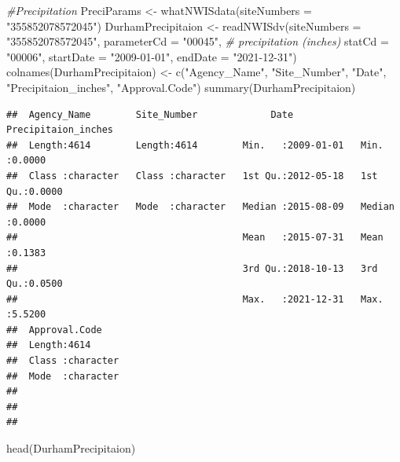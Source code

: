 \documentclass[
  12pt,
]{article}
\newenvironment{Shaded}{\begin{snugshade}}{\end{snugshade}}
\newcommand{\AttributeTok}[1]{\textcolor[rgb]{0.77,0.63,0.00}{#1}}
\newcommand{\CommentTok}[1]{\textcolor[rgb]{0.56,0.35,0.01}{\textit{#1}}}
\newcommand{\FunctionTok}[1]{\textcolor[rgb]{0.00,0.00,0.00}{#1}}
\newcommand{\NormalTok}[1]{#1}
\newcommand{\OtherTok}[1]{\textcolor[rgb]{0.56,0.35,0.01}{#1}}
\newcommand{\StringTok}[1]{\textcolor[rgb]{0.31,0.60,0.02}{#1}}
\begin{document}
\begin{Shaded}
\begin{Highlighting}[]
\CommentTok{\#Precipitation}
\NormalTok{PreciParams }\OtherTok{\textless{}{-}} \FunctionTok{whatNWISdata}\NormalTok{(}\AttributeTok{siteNumbers =} \StringTok{"355852078572045"}\NormalTok{)}
\NormalTok{DurhamPrecipitaion }\OtherTok{\textless{}{-}} \FunctionTok{readNWISdv}\NormalTok{(}\AttributeTok{siteNumbers =} \StringTok{"355852078572045"}\NormalTok{,}
                                 \AttributeTok{parameterCd =} \StringTok{"00045"}\NormalTok{, }\CommentTok{\# precipitation (inches)}
                                 \AttributeTok{statCd =} \StringTok{"00006"}\NormalTok{,}
                                 \AttributeTok{startDate =} \StringTok{"2009{-}01{-}01"}\NormalTok{,}
                                 \AttributeTok{endDate =} \StringTok{"2021{-}12{-}31"}\NormalTok{)}
\FunctionTok{colnames}\NormalTok{(DurhamPrecipitaion) }\OtherTok{\textless{}{-}} \FunctionTok{c}\NormalTok{(}\StringTok{"Agency\_Name"}\NormalTok{,}
                                 \StringTok{"Site\_Number"}\NormalTok{,}
                                 \StringTok{"Date"}\NormalTok{,}
                                 \StringTok{"Precipitaion\_inches"}\NormalTok{, }
                                 \StringTok{"Approval.Code"}\NormalTok{)}
\FunctionTok{summary}\NormalTok{(DurhamPrecipitaion)}
\end{Highlighting}
\end{Shaded}

\begin{verbatim}
##  Agency_Name        Site_Number             Date            Precipitaion_inches
##  Length:4614        Length:4614        Min.   :2009-01-01   Min.   :0.0000     
##  Class :character   Class :character   1st Qu.:2012-05-18   1st Qu.:0.0000     
##  Mode  :character   Mode  :character   Median :2015-08-09   Median :0.0000     
##                                        Mean   :2015-07-31   Mean   :0.1383     
##                                        3rd Qu.:2018-10-13   3rd Qu.:0.0500     
##                                        Max.   :2021-12-31   Max.   :5.5200     
##  Approval.Code     
##  Length:4614       
##  Class :character  
##  Mode  :character  
##                    
##                    
## 
\end{verbatim}

\begin{Shaded}
\begin{Highlighting}[]
\FunctionTok{head}\NormalTok{(DurhamPrecipitaion)}
\end{Highlighting}
\end{Shaded}
\end{document}
